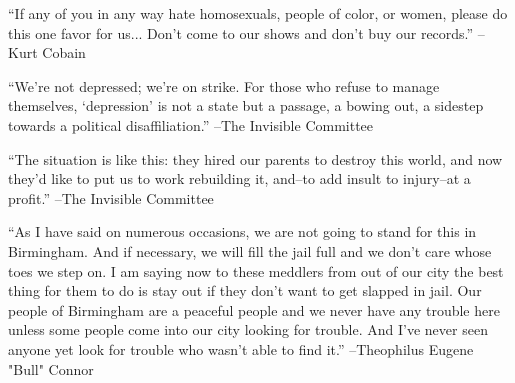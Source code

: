 \documentclass{article}%
\begin{document}
\linebreak%
\vspace{1mm}%
\begin{minipage}{\textwidth}%
\flushleft%
“If any of you in any way hate homosexuals, people of color, or women, please do this one favor for us... Don't come to our shows and don't buy our records.”%
\linebreak%
\vspace{1mm}%
–Kurt Cobain%
\linebreak%
\vspace{1mm}%
\end{minipage}%
\linebreak%
\vspace{1mm}%
\begin{minipage}{\textwidth}%
\flushleft%
“We're not depressed; we're on strike. For those who refuse to manage themselves, ‘depression’ is not a state but a passage, a bowing out, a sidestep towards a political disaffiliation.”%
\linebreak%
\vspace{1mm}%
–The Invisible Committee%
\linebreak%
\vspace{1mm}%
\end{minipage}%
\linebreak%
\vspace{1mm}%
\begin{minipage}{\textwidth}%
\flushleft%
“The situation is like this: they hired our parents to destroy this world, and now they'd like to put us to work rebuilding it, and–to add insult to injury–at  a profit.”%
\linebreak%
\vspace{1mm}%
–The Invisible Committee%
\linebreak%
\vspace{1mm}%
\end{minipage}%
\linebreak%
\vspace{1mm}%
\begin{minipage}{\textwidth}%
\flushleft%
“As I have said on numerous occasions, we are not going to stand for this in Birmingham. And if necessary, we will fill the jail full and we don't care whose toes we step on. I am saying now to these meddlers from out of our city the best thing for them to do is stay out if they don't want to get slapped in jail. Our people of Birmingham are a peaceful people and we never have any trouble here unless some people come into our city looking for trouble. And I've never seen anyone yet look for trouble who wasn't able to find it.”%
\linebreak%
\vspace{1mm}%
–Theophilus Eugene "Bull" Connor%
\linebreak%
\vspace{1mm}%
\end{minipage}%
\end{document}
